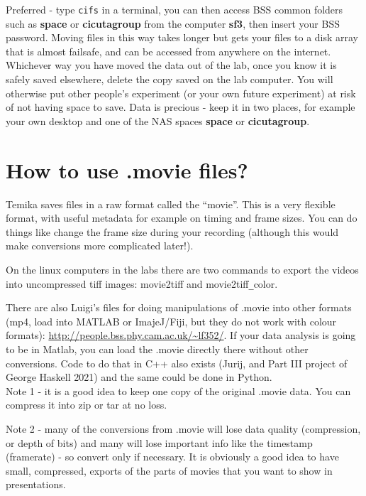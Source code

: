 \documentclass{report}
\begin{document}
Preferred - type \verb|cifs| in a  terminal,  you can then access BSS common folders such as \textbf{space} or \textbf{cicutagroup} from the computer \textbf{sf3}, then insert your BSS password. Moving files in this way takes longer but gets your files to a disk array that is almost failsafe, and can be accessed from anywhere on the internet.\\

Whichever way you have moved the data out of the lab, once you know it is safely saved elsewhere, delete the copy saved on the lab computer.   You will otherwise put other people's experiment (or your own future experiment) at risk of not having space to save.    Data is precious - keep it in two places, for example your own desktop and one of the NAS spaces \textbf{space} or \textbf{cicutagroup}.


\section{How to use .movie files?}
Temika saves files in a raw format called the ``movie''.   This is a very flexible format, with useful metadata for example on timing and frame sizes.   You can do things like change the frame size during your recording (although this would make conversions more complicated later!).

On the linux computers in the labs there are two commands to export the videos into uncompressed tiff images: movie2tiff and movie2tiff\verb|_|color.

There are also  Luigi’s files for doing manipulations of .movie into other formats (mp4, load into MATLAB or ImajeJ/Fiji, but they do not work with colour formats): \url{http://people.bss.phy.cam.ac.uk/~lf352/}. If your data analysis is going to be in Matlab, you can load the .movie directly there without other conversions. Code to do that in C++ also exists (Jurij, and Part III project of George Haskell 2021) and the same could be done in Python.\\

Note 1 - it is a good idea to keep one copy of the original .movie data.   You can compress it into zip or tar at no loss.

Note 2 -  many of the conversions from .movie will lose data quality (compression, or depth of bits) and many will lose important info like the timestamp (framerate) - so convert only if necessary.      It is obviously a good idea to have small, compressed, exports of the parts of movies that you want to show in presentations.
\end{document}
